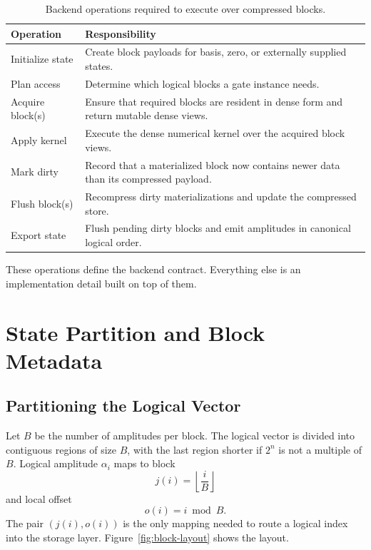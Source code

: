 \documentclass[runningheads]{llncs}
\begin{document}
\begin{table}
\centering
\caption{Backend operations required to execute over compressed blocks.}
\label{tab:backend-ops}
\begin{tabular}{p{}p{}}
\toprule
\textbf{Operation} & \textbf{Responsibility} \\
\midrule
Initialize state & Create block payloads for basis, zero, or externally supplied states. \\
Plan access & Determine which logical blocks a gate instance needs. \\
Acquire block(s) & Ensure that required blocks are resident in dense form and return mutable dense views. \\
Apply kernel & Execute the dense numerical kernel over the acquired block views. \\
Mark dirty & Record that a materialized block now contains newer data than its compressed payload. \\
Flush block(s) & Recompress dirty materializations and update the compressed store. \\
Export state & Flush pending dirty blocks and emit amplitudes in canonical logical order. \\
\bottomrule
\end{tabular}
\end{table}

These operations define the backend contract. Everything else is an implementation detail built on top of them.

\section{State Partition and Block Metadata}

\subsection{Partitioning the Logical Vector}

Let $B$ be the number of amplitudes per block. The logical vector is divided into contiguous regions of size $B$, with the last region shorter if $2^n$ is not a multiple of $B$. Logical amplitude $\alpha_i$ maps to block
\begin{equation}
  j(i)=\left\lfloor \frac{i}{B} \right\rfloor
\end{equation}
and local offset
\begin{equation}
  o(i)= i \bmod B.
\end{equation}
The pair $(j(i), o(i))$ is the only mapping needed to route a logical index into the storage layer. Figure~\ref{fig:block-layout} shows the layout.
\end{document}
